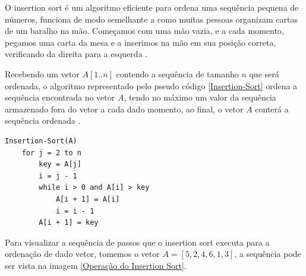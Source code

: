 \documentclass[
	12pt,				%
	openright,			%
	oneside,			%
	a4paper,			%
	english,			%
	brazil				%
	]{abntex2}
\begin{document}
O insertion sort é um algoritmo eficiente para ordena uma sequência pequena de números, funciona de modo semelhante a
como muitas pessoas organizam cartas de um baralho na mão. Começamos com uma mão vazia, e a cada momento, pegamos uma
carta da mesa e a inserimos na mão em sua posição correta, verificando da direita para a esquerda \cite{introductionAlgorthms}.

Recebendo um vetor $A[1..n]$ contendo a sequência de tamanho $n$ que será ordenada,  o algoritmo representado pelo
pseudo código \ref{Insertion-Sort} ordena a sequência encontrada no vetor $A$, tendo no máximo um valor da sequência 
armazenado fora do vetor a cada dado momento, ao final, o vetor $A$ conterá a sequência ordenada \cite{introductionAlgorthms}.

\lstset{style=psceudo}
\begin{lstlisting}[caption={\label{Insertion-Sort}Insertion-Sort}]
	Insertion-Sort(A)
	for j = 2 to n
		key = A[j]
		i = j - 1
		while i > 0 and A[i] > key
			A[i + 1] = A[i]
			i = i - 1
		A[i + 1] = key	
\end{lstlisting}

Para visualizar a sequência de passos que o insertion sort executa para a ordenação de dado vetor, 
tomemos o vetor $A = [5, 2, 4, 6, 1, 3]$, a sequência pode ser vista na imagem \ref{Operação do Insertion Sort}.
\end{document}
